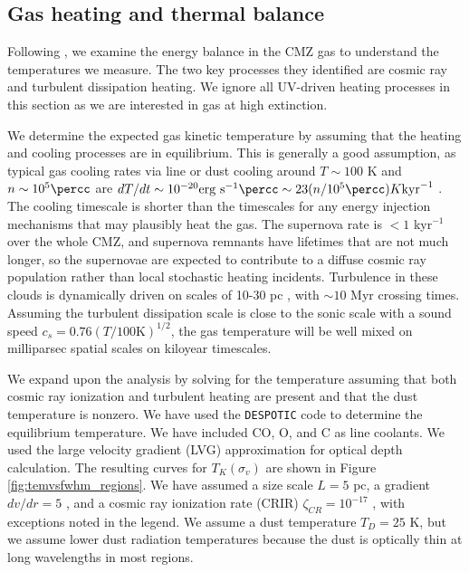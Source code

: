 \subsection{Gas heating and thermal balance}
\label{sec:heating}
Following \citet{Ao2013a}, we examine the energy balance in the CMZ gas to
understand the temperatures we measure.  The two key processes they identified
are cosmic ray and turbulent dissipation heating.  We ignore all UV-driven
heating processes in this section as we are interested in gas at high extinction.

We determine the expected gas kinetic temperature by assuming that the heating
and cooling processes are in equilibrium.  This is generally a good assumption,
as typical gas cooling rates via line or dust cooling around $T\sim100$ K and
$n\sim10^5\percc$ are $dT/dt \sim 10^{-20} \mathrm{erg~s}^{-1}\percc \sim 23
(n/10^5 \percc) K \mathrm{kyr}^{-1}$ \citep[][and see below]{Goldsmith2001a}.
The cooling timescale is shorter than the timescales for any energy injection
mechanisms that may
plausibly heat the gas.  The supernova rate is $<1$ kyr$^{-1}$ over the whole CMZ, and
supernova remnants have lifetimes that are not much longer, so the supernovae
are expected to contribute to a diffuse cosmic ray population rather than local
stochastic heating incidents.  Turbulence in these clouds is dynamically driven
on scales of 10-30 pc \citep{Kruijssen2015a}, with $\sim10$ Myr crossing times.
Assuming the turbulent dissipation scale is close to the sonic scale with a
sound speed $c_s = 0.76 (T/100\mathrm{K})^{1/2}$, the gas temperature will be
well mixed on milliparsec spatial scales on kiloyear timescales.

We expand upon the \citet{Ao2013a} analysis by solving for the temperature
assuming that both cosmic ray ionization and turbulent heating are present and
that the dust temperature is nonzero.  We have used the \texttt{DESPOTIC} code
\citep{Krumholz2013a} to determine the equilibrium temperature.  We have
included CO, O, and C as line coolants.  We used the large velocity gradient
(LVG) approximation for optical depth calculation.  The resulting curves for
$T_K(\sigma_v)$ are shown in Figure \ref{fig:temvsfwhm_regions}.  We have
assumed a size scale $L=5$ pc, a gradient $dv/dr = 5$ \kms \perpc, and a cosmic
ray ionization rate (CRIR) $\zeta_{CR}=10^{-17}$ \pers, with exceptions noted
in the legend.  We assume a dust temperature $T_D=25$ K, but we assume lower
dust radiation temperatures because the dust is optically thin at long
wavelengths in most regions.

